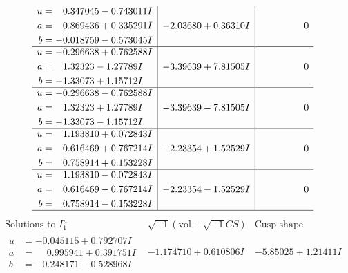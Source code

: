 \documentclass[1p]{elsarticle_modified}
\theoremstyle{definition}
\newcommand{\I}{\sqrt{-1}}
\begin{document}
$$\begin{array}{c|c|c}
\begin{aligned}
u &= \phantom{-}0.347045 - 0.743011 I \\
a &= \phantom{-}0.869436 + 0.335291 I \\
b &= -0.018759 - 0.573045 I\end{aligned}
 & -2.03680 + 0.36310 I & \phantom{-0.000000 } 0 \\ \hline\begin{aligned}
u &= -0.296638 + 0.762588 I \\
a &= \phantom{-}1.32323 - 1.27789 I \\
b &= -1.33073 + 1.15712 I\end{aligned}
 & -3.39639 + 7.81505 I & \phantom{-0.000000 } 0 \\ \hline\begin{aligned}
u &= -0.296638 - 0.762588 I \\
a &= \phantom{-}1.32323 + 1.27789 I \\
b &= -1.33073 - 1.15712 I\end{aligned}
 & -3.39639 - 7.81505 I & \phantom{-0.000000 } 0 \\ \hline\begin{aligned}
u &= \phantom{-}1.193810 + 0.072843 I \\
a &= \phantom{-}0.616469 + 0.767214 I \\
b &= \phantom{-}0.758914 + 0.153228 I\end{aligned}
 & -2.23354 + 1.52529 I & \phantom{-0.000000 } 0 \\ \hline\begin{aligned}
u &= \phantom{-}1.193810 - 0.072843 I \\
a &= \phantom{-}0.616469 - 0.767214 I \\
b &= \phantom{-}0.758914 - 0.153228 I\end{aligned}
 & -2.23354 - 1.52529 I & \phantom{-0.000000 } 0\\
 \hline 
 \end{array}$$\newpage$$\begin{array}{c|c|c}  
\text{Solutions to }I^u_{1}& \I (\text{vol} + \sqrt{-1}CS) & \text{Cusp shape}\\
 \hline 
\begin{aligned}
u &= -0.045115 + 0.792707 I \\
a &= \phantom{-}0.995941 + 0.391751 I \\
b &= -0.248171 - 0.528968 I\end{aligned}
 & -1.174710 + 0.610806 I & -5.85025 + 1.21411 I \\ \hline\begin{aligned}

\end{aligned}
\end{array}$$
\end{document}
